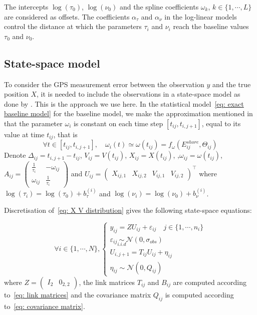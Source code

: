 \documentclass[11pt]{article}
\newcommand {\1}{\mathbb{1}}
\theoremstyle{definition}
\theoremstyle{remark}
\theoremstyle{remark}
\begin{document}
The intercepts $\log(\tau_0)$, $\log(\nu_0)$ and the spline coefficients $\omega_k$, $k \in \{1,\cdots,L\}$ are considered as offsets.
The coefficients $\alpha_{\tau}$ and $\alpha_{\nu}$ in the log-linear models control the distance at which the parameters $\tau_i$ and $\nu_i$ reach the baseline values $\tau_0$ and $\nu_0$.




\subsection{State-space model}
\label{section: state space model}
To consider the GPS measurement error between the observation $y$ and the true position $X$, it is needed to include the observations in a state-space model as done by \cite{johnson_continuoustime_2008}. This is the approach we use here. In the statistical model~\eqref{eq: exact baseline model} for the baseline model, we make the approximation mentioned in \cite{michelot_varying-coefficient_2021} that the parameter $\omega_i$ is constant on each time step $[t_{ij},t_{i,j+1}]$, equal to its value at time $t_{ij}$, that is 
\[\forall t \in [t_{ij},t_{i,j+1}], \quad \omega_{i}(t) \simeq \omega(t_{ij})= f_{\omega}(E^{shore}_{ij},\Theta_{ij})\]
 Denote $\Delta_{ij}=t_{i,j+1}-t_{ij}$, $V_{ij}=V(t_{ij})$, $X_{ij}=X(t_{ij})$, ,$\omega_{ij}=\omega(t_{ij})$, $A_{ij}=\begin{pmatrix} 
	\frac{1}{\tau_{i}} & -\omega_{ij} \\
	\omega_{ij} & \frac{1}{\tau_{i}}
\end{pmatrix}$ and $U_{ij}=\begin{pmatrix} X_{ij,1}  & X_{ij,2} & V_{ij,1} & V_{ij,2}\end{pmatrix}^\top$ where $\log(\tau_i)=\log(\tau_0)+b_{\tau}^{(i)}$ and $\log(\nu_i)=\log(\nu_0)+b_{\nu}^{(i)}$.

Discretisation of~\eqref{eq: X V distribution} gives the following state-space equations:

\begin{equation}
	\forall i \in \{1,\cdots,N\}, \left\{
	\begin{array}{l}
		y_{ij}=ZU_{ij}+\varepsilon_{ij} \quad j \in \{1,\cdots,n_i\}\\
		\varepsilon_{ij} \underset{i.i.d}{\sim} \mathcal{N}(0,\sigma_{obs}) \\
		U_{i,j+1}=T_{ij} U_{ij} + \eta_{ij} \\
		\eta_{ij} \sim \mathcal{N}(0,Q_{ij})
	\end{array}
	\right.
	\label{eq: RACVM state space}
\end{equation}
where $Z=\begin{pmatrix} I_2 & 0_{2,2}\end{pmatrix}$, the link matrices $T_{ij}$ and $B_{ij}$ are computed according to~\eqref{eq: link matrices} and the covariance matrix $Q_{ij}$ is computed according to~\eqref{eq: covariance matrix}.
\\
\end{document}
